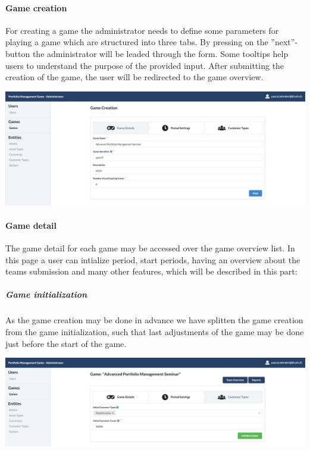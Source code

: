\paragraph{Game creation}
For creating a game the administrator needs to define some parameters for playing a game which are structured into three tabs. By pressing on the ''next''-button the administrator will be leaded through the form. Some tooltips help users to understand the purpose of the provided input. After submitting the creation of the game, the user will be redirected to the game overview.
\begin{center}
  \includegraphics[scale=0.2]{img/application-overview/administrator/game_creation.png}
\end{center}

\paragraph{Game detail}
The game detail for each game may be accessed over the game overview list. In this page a user can intialize period, start periods, having an overview about the teams submission and many other features, which will be described in this part:

\subparagraph{Game initialization}
As the game creation may be done in advance we have splitten the game creation from the game initialization, such that last adjustments of the game may be done just before the start of the game.
\begin{center}
  \includegraphics[scale=0.2]{img/application-overview/administrator/game_initialization.png}
\end{center}

